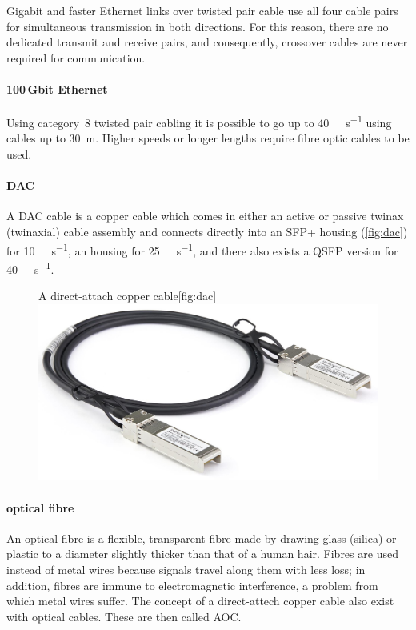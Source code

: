 Gigabit and faster Ethernet links over twisted pair cable use all four cable pairs for simultaneous transmission in both directions.
For this reason, there are no dedicated transmit and receive pairs, and consequently, crossover cables are never required for  communication.

\paragraph{100\,Gbit Ethernet}
Using category~8 twisted pair cabling it is possible to go up to \SI{40}{\giga\bit\per\second} using cables up to \SI{30}{\metre}.
Higher speeds or longer lengths require fibre optic cables to be used.

\paragraph{\acl{DAC}}
A \acf{DAC} cable is a copper cable which comes in either an active or passive twinax (twinaxial) cable assembly and connects directly into an
\acs{SFP+} housing (\vref{fig:dac}) for \SI{10}{\giga\bit\per\second},
an  housing for \SI{25}{\giga\bit\per\second},
and there also exists a \acs{QSFP} version for \SI{40}{\giga\bit\per\second}.

\begin{figure}
\begin{sidecaption}{A direct-attach copper cable}[fig:dac]
\centering
\includegraphics[width=\textwidth]{images/physical/dac-cable.jpeg}
\end{sidecaption}
\end{figure}

\paragraph{optical fibre}
An optical fibre is a flexible, transparent fibre made by drawing glass (silica) or plastic to a diameter slightly thicker than that of a human hair.
Fibres are used instead of metal wires because signals travel along them with less loss; in addition, fibres are immune to electromagnetic interference, a problem from which metal wires suffer.
The concept of a direct-attech copper cable also exist with optical cables.
These are then called \acf{AOC}.

